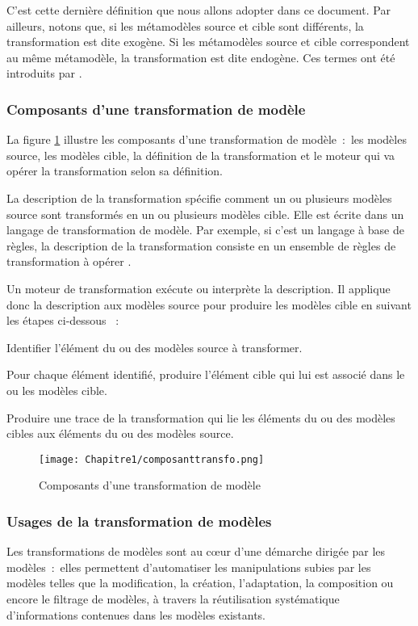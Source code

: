 C'est cette dernière définition que nous allons adopter dans ce document. Par ailleurs, notons que, si les métamodèles source et cible sont différents, la transformation est dite exogène. Si les métamodèles source et cible correspondent au même métamodèle, la transformation est dite endogène. Ces termes ont été introduits par \cite{mens2006taxonomy}.

\subsubsection{Composants d'une transformation de modèle} 
La figure \ref{fig:composantTransfo} illustre les composants d'une transformation de modèle~:~les modèles source, les modèles cible, la définition de la transformation et le moteur qui va opérer la transformation selon sa définition. 

La description de la transformation spécifie comment un ou plusieurs modèles source sont transformés en un ou plusieurs modèles cible. Elle est écrite dans un langage de transformation de modèle. Par exemple, si c'est un langage à base de règles, la description de la transformation consiste en un ensemble de règles de transformation à opérer \cite{kleppe2003mda}. 

Un moteur de transformation exécute ou interprète la description. Il applique donc la description aux modèles source pour produire les modèles cible en suivant les étapes ci-dessous \cite{tratt2005model}~:

\begin{bulletList}
\item Identifier l'élément du ou des modèles source à transformer.
\item Pour chaque élément identifié, produire l'élément cible qui lui est associé dans le ou les modèles cible.
\item Produire une trace de la transformation qui lie les éléments du ou des modèles cibles aux éléments du ou des modèles source.
\end{bulletList}

\begin{figure}[!htbp]
 \begin{center}
   \texttt{[image: Chapitre1/composanttransfo.png]}
 \end{center}
 \caption{Composants d'une transformation de modèle}
 \label{fig:composantTransfo}
\end{figure}

\subsubsection{Usages de la transformation de modèles }
Les transformations de modèles sont au cœur d'une démarche dirigée par les modèles~:~elles permettent d'automatiser les manipulations subies par les modèles telles que la modification, la création, l'adaptation, la composition ou encore le filtrage de modèles, à travers la réutilisation systématique d'informations contenues dans les modèles existants. 

